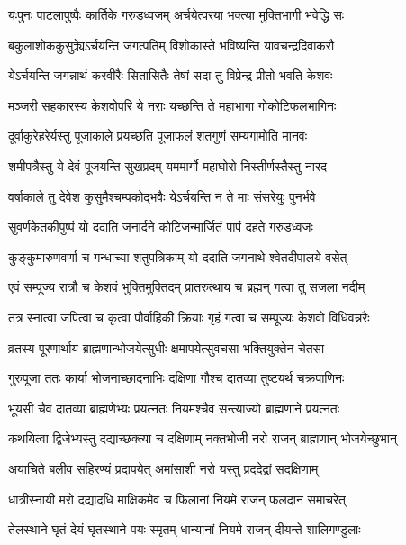 \twolineshloka
{यःपुनः पाटलापुष्पैः कार्तिके गरुडध्वजम्}
{अर्चयेत्परया भक्त्या मुक्तिभागी भवेद्धि सः} %

\twolineshloka
{बकुलाशोककुसुक्र्येऽर्चयन्ति जगत्पतिम्}
{विशोकास्ते भविष्यन्ति यावचन्द्रदिवाकरौ} %

\twolineshloka
{येऽर्चयन्ति जगन्नाथं करवीरैः सितासितैः}
{तेषां सदा तु विप्रेन्द्र प्रीतो भवति केशवः} %

\twolineshloka
{मञ्जरी सहकारस्य केशवोपरि ये नराः}
{यच्छन्ति ते महाभागा गोकोटिफलभागिनः} %

\twolineshloka
{दूर्वाकुरेहरेर्यस्तु पूजाकाले प्रयच्छति}
{पूजाफलं शतगुणं सम्यगामोति मानवः} %

\twolineshloka
{शमीपत्रैस्तु ये देवं पूजयन्ति सुखप्रदम्}
{यममार्गो महाघोरो निस्तीर्णस्तैस्तु नारद} %

\twolineshloka
{वर्षाकाले तु देवेश कुसुमैश्चम्पकोद्भवैः}
{येऽर्चयन्ति न ते माः संसरेयुः पुनर्भवे} %

\twolineshloka
{सुवर्णकेतकीपुष्पं यो ददाति जनार्दने}
{कोटिजन्मार्जितं पापं दहते गरुडध्वजः} %

\twolineshloka
{कुङ्कुमारुणवर्णा च गन्धाच्या शतुपत्रिकाम्}
{यो ददाति जगनाथे श्वेतदीपालये वसेत्} %

\twolineshloka
{एवं सम्पूज्य रात्रौ च केशवं भुक्तिमुक्तिदम्}
{प्रातरुत्थाय च ब्रह्मन् गत्वा तु सजला नदीम्} %

\twolineshloka
{तत्र स्नात्वा जपित्वा च कृत्वा पौर्वाहिकी क्रियाः}
{गृहं गत्वा च सम्पूज्यः केशवो विधिवन्नरैः} %

\twolineshloka
{व्रतस्य पूरणार्थाय ब्राह्मणान्भोजयेत्सुधीः}
{क्षमापयेत्सुवचसा भक्तियुक्तेन चेतसा} %

\twolineshloka
{गुरुपूजा ततः कार्या भोजनाच्छादनाभिः}
{दक्षिणा गौश्च दातव्या तुष्टयर्थ चक्रपाणिनः} %

\twolineshloka
{भूयसी चैव दातव्या ब्राह्मणेभ्यः प्रयत्नतः}
{नियमश्चैव सन्त्याज्यो ब्राह्मणाने प्रयत्नतः} %

\twolineshloka
{कथयित्वा द्विजेभ्यस्तु दद्याच्छक्त्या च दक्षिणाम्}
{नक्तभोजी नरो राजन् ब्राह्मणान् भोजयेच्छुभान्} %

\twolineshloka
{अयाचिते बलीव सहिरण्यं प्रदापयेत्}
{अमांसाशी नरो यस्तु प्रददेद्रां सदक्षिणाम्} %

\twolineshloka
{धात्रीस्नायी मरो दद्यादधि माक्षिकमेव च}
{फिलानां नियमे राजन् फलदान समाचरेत्} %

\twolineshloka
{तेलस्थाने घृतं देयं घृतस्थाने पयः स्मृतम्}
{धान्यानां नियमे राजन् दीयन्ते शालिगण्डुलाः} %

